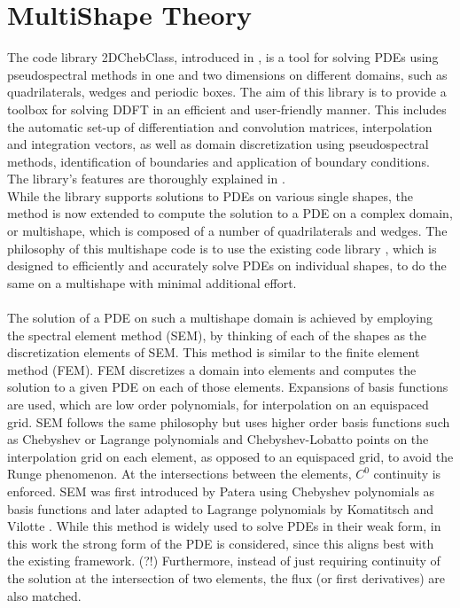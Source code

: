 \documentclass[11pt, a4paper]{article}
\theoremstyle{definition}
\begin{document}
\section*{MultiShape Theory}
The code library 2DChebClass, introduced in \cite{GoddardPseudospectralCode1}, is a tool for solving PDEs using pseudospectral methods in one and two dimensions on different domains, such as quadrilaterals, wedges and periodic boxes. The aim of this library is to provide a toolbox for solving DDFT in an efficient and user-friendly manner. This includes the automatic set-up of differentiation and convolution matrices, interpolation and integration vectors, as well as domain discretization using pseudospectral methods, identification of boundaries and application of boundary conditions. The library's features are thoroughly explained in \cite{GoddardPseudospectralCode1}.
\\
While the library supports solutions to PDEs on various single shapes, the method is now extended to compute the solution to a PDE on a complex domain, or multishape, which is composed of a number of quadrilaterals and wedges. The philosophy of this multishape code is to use the existing code library \cite{GoddardPseudospectralCode1}, which is designed to efficiently and accurately solve PDEs on individual shapes, to do the same on a multishape with minimal additional effort. 
\\
\\
The solution of a PDE on such a multishape domain is achieved by employing the spectral element method (SEM), by thinking of each of the shapes as the discretization elements of SEM.
This method is similar to the finite element method (FEM). FEM discretizes a domain into elements and computes the solution to a given PDE on each of those elements. Expansions of basis functions are used, which are low order polynomials, for interpolation on an equispaced grid. SEM follows the same philosophy but uses higher order basis functions such as Chebyshev or Lagrange polynomials and Chebyshev-Lobatto points on the interpolation grid on each element, as opposed to an equispaced grid, to avoid the Runge phenomenon. At the intersections between the elements, $C^0$ continuity is enforced. SEM was first introduced by Patera \cite{SEMPatera84} using  Chebyshev polynomials as basis functions and later adapted to Lagrange polynomials by Komatitsch and Vilotte \cite{SEMLagrange98}.
While this method is widely used to solve PDEs in their weak form, in this work the strong form of the PDE is considered, since this aligns best with the existing framework. (?!) Furthermore, instead of just requiring continuity of the solution at the intersection of two elements, the flux (or first derivatives) are also matched. 
\end{document}
